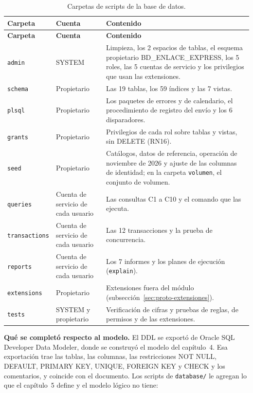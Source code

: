 {\singlespacing\small
\begin{longtable}{L{3.3cm} L{2.4cm} L{8.7cm}}
\caption{Carpetas de scripts de la base de datos.}
\label{tab:proto-scripts}\\
\toprule
\textbf{Carpeta} & \textbf{Cuenta} & \textbf{Contenido} \\
\midrule
\endfirsthead
\toprule
\textbf{Carpeta} & \textbf{Cuenta} & \textbf{Contenido} \\
\midrule
\endhead
\bottomrule
\endfoot
\texttt{admin} & SYSTEM & Limpieza, los 2 espacios de tablas, el esquema propietario BD\_ENLACE\_EXPRESS, los 5 roles, las 5 cuentas de servicio y los privilegios que usan las extensiones. \\
\texttt{schema} & Propietario & Las 19 tablas, los 59 índices y las 7 vistas. \\
\texttt{plsql} & Propietario & Los paquetes de errores y de calendario, el procedimiento de registro del envío y los 6 disparadores. \\
\texttt{grants} & Propietario & Privilegios de cada rol sobre tablas y vistas, sin DELETE (RN16). \\
\texttt{seed} & Propietario & Catálogos, datos de referencia, operación de noviembre de 2026 y ajuste de las columnas de identidad; en la carpeta \texttt{volumen}, el conjunto de volumen. \\
\texttt{queries} & Cuenta de servicio de cada usuario & Las consultas C1 a C10 y el comando que las ejecuta. \\
\texttt{transactions} & Cuenta de servicio de cada usuario & Las 12 transacciones y la prueba de concurrencia. \\
\texttt{reports} & Cuenta de servicio de cada usuario & Los 7 informes y los planes de ejecución (\texttt{explain}). \\
\texttt{extensions} & Propietario & Extensiones fuera del módulo (subsección~\ref{sec:proto-extensiones}). \\
\texttt{tests} & SYSTEM y propietario & Verificación de cifras y pruebas de reglas, de permisos y de las extensiones. \\
\end{longtable}
\par}

\textbf{Qué se completó respecto al modelo.} El DDL se exportó de
Oracle SQL Developer Data Modeler, donde se construyó el modelo del
capítulo~4. Esa exportación trae las tablas, las columnas, las
restricciones NOT NULL, DEFAULT, PRIMARY KEY, UNIQUE, FOREIGN KEY y CHECK
y los comentarios, y coincide con el documento. Los scripts de
\texttt{database/} le agregan lo que el capítulo~5 define y el modelo lógico no
tiene:

